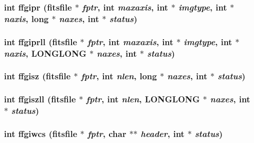\subsubsection{\setlength{\rightskip}{0pt plus 5cm}int ffgipr (\bf{fitsfile} $\ast$ {\em fptr}, int {\em maxaxis}, int $\ast$ {\em imgtype}, int $\ast$ {\em naxis}, long $\ast$ {\em naxes}, int $\ast$ {\em status})}\label{src_2fitsio_8h_36cf874c199041ee45957859c011adc4}


\subsubsection{\setlength{\rightskip}{0pt plus 5cm}int ffgiprll (\bf{fitsfile} $\ast$ {\em fptr}, int {\em maxaxis}, int $\ast$ {\em imgtype}, int $\ast$ {\em naxis}, \bf{LONGLONG} $\ast$ {\em naxes}, int $\ast$ {\em status})}\label{src_2fitsio_8h_bf531fec534d692d887dc85d0c415611}


\subsubsection{\setlength{\rightskip}{0pt plus 5cm}int ffgisz (\bf{fitsfile} $\ast$ {\em fptr}, int {\em nlen}, long $\ast$ {\em naxes}, int $\ast$ {\em status})}\label{src_2fitsio_8h_8d84fada6d2b3d4c9e4153716437728c}


\subsubsection{\setlength{\rightskip}{0pt plus 5cm}int ffgiszll (\bf{fitsfile} $\ast$ {\em fptr}, int {\em nlen}, \bf{LONGLONG} $\ast$ {\em naxes}, int $\ast$ {\em status})}\label{src_2fitsio_8h_9f3109f783dd55f01dd7e8130e9c355a}


\subsubsection{\setlength{\rightskip}{0pt plus 5cm}int ffgiwcs (\bf{fitsfile} $\ast$ {\em fptr}, char $\ast$$\ast$ {\em header}, int $\ast$ {\em status})}\label{src_2fitsio_8h_4a3092c0f23da761c8063c15c1aba03e}


